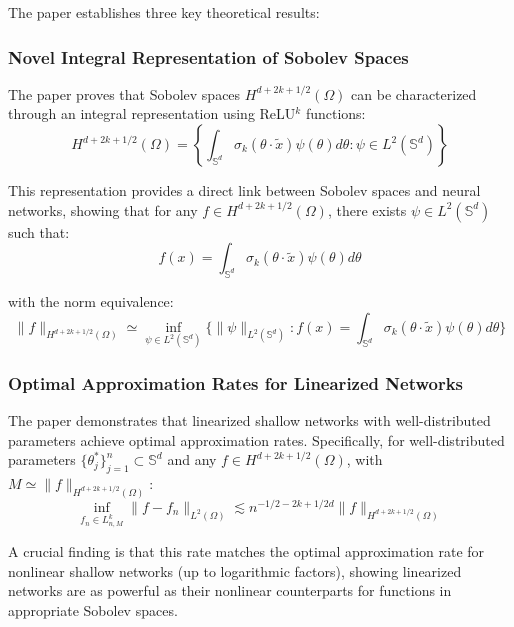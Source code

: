 \documentclass[11pt]{article}
\begin{document}
The paper establishes three key theoretical results:

\subsubsection{Novel Integral Representation of Sobolev Spaces}

The paper proves that Sobolev spaces $H^{d+2k+1/2}(\Omega)$ can be characterized through an integral representation using ReLU$^k$ functions:
\begin{equation}
H^{d+2k+1/2}(\Omega) = \left\{\int_{\mathbb{S}^d} \sigma_k(\theta \cdot \tilde{x}) \psi(\theta) d\theta : \psi \in L^2(\mathbb{S}^d) \right\}
\end{equation}

This representation provides a direct link between Sobolev spaces and neural networks, showing that for any $f \in H^{d+2k+1/2}(\Omega)$, there exists $\psi \in L^2(\mathbb{S}^d)$ such that:
\begin{equation}
f(x) = \int_{\mathbb{S}^d} \sigma_k(\theta \cdot \tilde{x}) \psi(\theta) d\theta
\end{equation}

with the norm equivalence:
\begin{equation}
\|f\|_{H^{d+2k+1/2}(\Omega)} \simeq \inf_{\psi \in L^2(\mathbb{S}^d)} \{\|\psi\|_{L^2(\mathbb{S}^d)} : f(x) = \int_{\mathbb{S}^d} \sigma_k(\theta \cdot \tilde{x}) \psi(\theta) d\theta\}
\end{equation}

\subsubsection{Optimal Approximation Rates for Linearized Networks}

The paper demonstrates that linearized shallow networks with well-distributed parameters achieve optimal approximation rates. Specifically, for well-distributed parameters $\{\theta_j^*\}_{j=1}^n \subset \mathbb{S}^d$ and any $f \in H^{d+2k+1/2}(\Omega)$, with $M \simeq \|f\|_{H^{d+2k+1/2}(\Omega)}$:
\begin{equation}
\inf_{f_n \in L_{n,M}^k} \|f - f_n\|_{L^2(\Omega)} \lesssim n^{-1/2-2k+1/2d} \|f\|_{H^{d+2k+1/2}(\Omega)}
\end{equation}

A crucial finding is that this rate matches the optimal approximation rate for nonlinear shallow networks (up to logarithmic factors), showing linearized networks are as powerful as their nonlinear counterparts for functions in appropriate Sobolev spaces.
\end{document}
